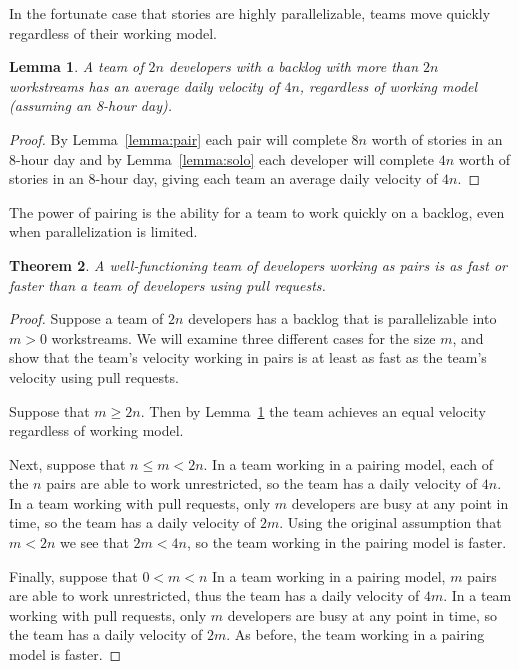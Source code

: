 \documentclass[letterpaper]{article}
\newtheorem{theorem}{Theorem}[section]
\newtheorem{lemma}[theorem]{Lemma}
\theoremstyle{definition}
\begin{document}
    In the fortunate case that stories are highly parallelizable, teams move quickly regardless of their working model.

    \begin{lemma}
        \label{lemma:parallel}
        A team of $2n$ developers with a backlog with more than $2n$ workstreams has an average daily velocity of $4n$,
        regardless of working model (assuming an 8-hour day).
    \end{lemma}
    \begin{proof}
        By Lemma~\ref{lemma:pair} each pair will complete $8n$ worth of stories in an 8-hour day and by
        Lemma~\ref{lemma:solo} each developer will complete $4n$ worth of stories in an 8-hour day, giving each team an
        average daily velocity of $4n$.
    \end{proof}

    The power of pairing is the ability for a team to work quickly on a backlog, even when parallelization is limited.

    \begin{theorem}
        A well-functioning team of developers working as pairs is as fast or faster than a team of developers using pull
        requests.
    \end{theorem}
    \begin{proof}
        Suppose a team of $2n$ developers has a backlog that is parallelizable into $m > 0$ workstreams.
        We will examine three different cases for the size $m$, and show that the team's velocity working in pairs is at
        least as fast as the team's velocity using pull requests.

        Suppose that $m\geq 2n$.
        Then by Lemma~\ref{lemma:parallel} the team achieves an equal velocity regardless of working model.

        Next, suppose that $n\leq m < 2n$.
        In a team working in a pairing model, each of the $n$ pairs are able to work unrestricted, so the team has a
        daily velocity of $4n$.
        In a team working with pull requests, only $m$ developers are busy at any point in time, so the team has a daily
        velocity of $2m$.
        Using the original assumption that $m < 2n$ we see that $2m < 4n$, so the team working in the pairing model is
        faster.

        Finally, suppose that $0 < m < n$
        In a team working in a pairing model, $m$ pairs are able to work unrestricted, thus the team has a daily
        velocity of $4m$.
        In a team working with pull requests, only $m$ developers are busy at any point in time, so the team has a daily
        velocity of $2m$.
        As before, the team working in a pairing model is faster.
    \end{proof}
\end{document}
